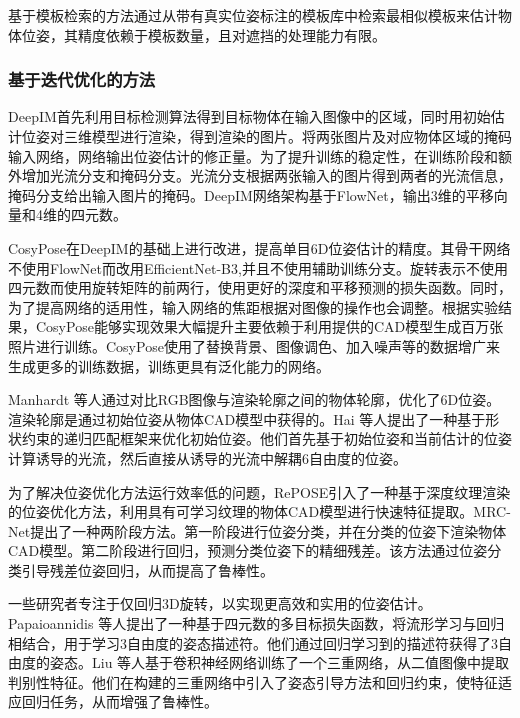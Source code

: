 \par 基于模板检索的方法通过从带有真实位姿标注的模板库中检索最相似模板来估计物体位姿，其精度依赖于模板数量，且对遮挡的处理能力有限。

\subsubsection{基于迭代优化的方法}\label{基于迭代优化的方法}

DeepIM\cite{li2018deepim}首先利用目标检测算法得到目标物体在输入图像中的区域，同时用初始估计位姿对三维模型进行渲染，得到渲染的图片。将两张图片及对应物体区域的掩码输入网络，网络输出位姿估计的修正量。为了提升训练的稳定性，在训练阶段和额外增加光流分支和掩码分支。光流分支根据两张输入的图片得到两者的光流信息，掩码分支给出输入图片的掩码。DeepIM网络架构基于FlowNet\cite{dosovitskiy2015flownet}，输出3维的平移向量和4维的四元数。

\par CosyPose\cite{labbe2020cosypose}在DeepIM\cite{li2018deepim}的基础上进行改进，提高单目6D位姿估计的精度。其骨干网络不使用FlowNet\cite{dosovitskiy2015flownet}而改用EfficientNet-B3\cite{koonce2021efficientnet},并且不使用辅助训练分支。旋转表示不使用四元数而使用旋转矩阵的前两行，使用更好的深度和平移预测的损失函数。同时，为了提高网络的适用性，输入网络的焦距根据对图像的操作也会调整。根据实验结果，CosyPose能够实现效果大幅提升主要依赖于利用提供的CAD模型生成百万张照片进行训练。CosyPose使用了替换背景、图像调色、加入噪声等的数据增广来生成更多的训练数据，训练更具有泛化能力的网络。

\par Manhardt 等人\cite{manhardt2018deep}通过对比RGB图像与渲染轮廓之间的物体轮廓，优化了6D位姿。渲染轮廓是通过初始位姿从物体CAD模型中获得的。Hai 等人\cite{hai2023shape}提出了一种基于形状约束的递归匹配框架来优化初始位姿。他们首先基于初始位姿和当前估计的位姿计算诱导的光流，然后直接从诱导的光流中解耦6自由度的位姿。

\par 为了解决位姿优化方法运行效率低的问题，RePOSE\cite{Repose}引入了一种基于深度纹理渲染的位姿优化方法，利用具有可学习纹理的物体CAD模型进行快速特征提取。MRC-Net\cite{li2024mrcnet}提出了一种两阶段方法。第一阶段进行位姿分类，并在分类的位姿下渲染物体CAD模型。第二阶段进行回归，预测分类位姿下的精细残差。该方法通过位姿分类引导残差位姿回归，从而提高了鲁棒性。

一些研究者专注于仅回归3D旋转，以实现更高效和实用的位姿估计。Papaioannidis 等人\cite{papaioannidis20193d}提出了一种基于四元数的多目标损失函数，将流形学习与回归相结合，用于学习3自由度的姿态描述符。他们通过回归学习到的描述符获得了3自由度的姿态。Liu 等人\cite{liu2019regression}基于卷积神经网络训练了一个三重网络，从二值图像中提取判别性特征。他们在构建的三重网络中引入了姿态引导方法和回归约束，使特征适应回归任务，从而增强了鲁棒性。

